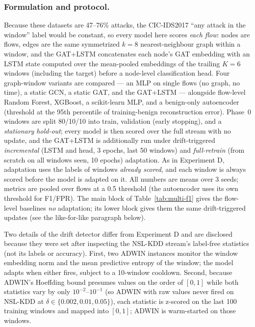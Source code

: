 \documentclass[twocolumn]{llncs}
\begin{document}
\subsubsection{Formulation and protocol.} Because these datasets are 47--76\% attacks, the
CIC-IDS2017 ``any attack in the window'' label would be constant, so every model here scores
\emph{each flow}: nodes are flows, edges are the same symmetrized $k=8$ nearest-neighbour graph
within a window, and the GAT+LSTM concatenates each node's GAT embedding with an LSTM state
computed over the mean-pooled embeddings of the trailing $K=6$ windows (including the target)
before a node-level classification head. Four graph-window variants are compared --- an MLP on
single flows (no graph, no time), a static GCN, a static GAT, and the GAT+LSTM --- alongside
flow-level Random Forest, XGBoost, a scikit-learn MLP, and a benign-only autoencoder (threshold at
the 95th percentile of training-benign reconstruction error). Phase~0 windows are split 80/10/10
into train, validation (early stopping), and a \emph{stationary hold-out}; every model is then scored
over the full stream with no update, and the GAT+LSTM is additionally run under drift-triggered
\emph{incremental} (LSTM and head, 3 epochs, last 50 windows) and \emph{full-retrain} (from scratch
on all windows seen, 10 epochs) adaptation. As in Experiment D, adaptation uses the labels of windows
\emph{already scored}, and each window is always scored before the model is adapted on it. All
numbers are means over 3 seeds; metrics are pooled over flows at a 0.5 threshold (the autoencoder
uses its own threshold for F1/FPR). The main block of Table~\ref{tab:multi-f1} gives the flow-level baselines \emph{no} adaptation; its lower block gives them the same drift-triggered updates (see the like-for-like paragraph below).

Two details of the drift detector differ from Experiment D and are disclosed because they were set
after inspecting the NSL-KDD stream's label-free statistics (not its labels or accuracy). First, two
ADWIN instances monitor the window embedding norm and the mean predictive entropy of the window; the
model adapts when either fires, subject to a 10-window cooldown. Second, because ADWIN's Hoeffding
bound presumes values on the order of $[0,1]$ while both statistics vary by only $10^{-2}$--$10^{-1}$
(so ADWIN with raw values never fired on NSL-KDD at $\delta\in\{0.002, 0.01, 0.05\}$), each statistic
is z-scored on the last 100 training windows and mapped into $[0,1]$; ADWIN is warm-started on those
windows.
\end{document}
